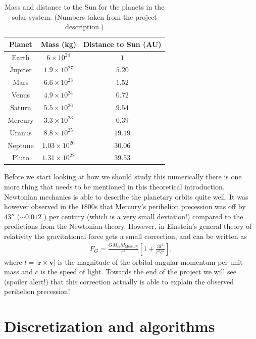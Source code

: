 \documentclass[12pt, a4paper]{article}
\begin{document}
\begin{table}
\caption{Mass and distance to the Sun for the planets in the solar system. (Numbers taken from the 
project description.)}
\label{tab:planets}
\begin{center}
\begin{tabular}{ccc} \hline\hline
Planet & Mass (kg) & Distance to Sun (AU) \\ \hline 
Earth & $6\times10^{24}$ & $1$  \\
Jupiter & $1.9\times10^{27}$ & $5.20$  \\
Mars & $6.6\times10^{23}$ & $1.52$ \\
Venus & $4.9\times10^{24}$ & $0.72$ \\
Saturn & $5.5\times10^{26}$ & $9.54$ \\ 
Mercury & $3.3\times10^{23}$ & $0.39$ \\ 
Uranus & $8.8\times10^{25}$ & $19.19$ \\ 
Neptune & $1.03\times10^{26}$ & $30.06$  \\ 
Pluto & $1.31\times10^{22}$ & $39.53$ \\ \hline \hline
\end{tabular}
\end{center}
\end{table}

Before we start looking at how we should study this numerically there is one more thing that needs to 
be mentioned in this theoretical introduction. Newtonian mechanics is able to describe 
the planetary orbits quite well. It was however observed in the $1800$s that Mercury's 
perihelion precession was off by
$43''$ ($\sim 0.012^{\circ}$) per century (which is a very small deviation!) compared to the 
predictions from the Newtonian theory. However, in Einstein's general theory of relativity 
the gravitational force gets a small correction, and can be written as 
\begin{align*}
F_G = \frac{GM_{\odot}M_{\text{Mercury}}}{r^2}\left[ 1+ \frac{3l^2}{r^2c^2} \right], 
\end{align*} 
where $l=|\mathbf{r}\times \mathbf{v}|$ is the magnitude of the orbital angular momentum per unit mass and 
$c$ is the speed of light. Towards the end of the project we will see (spoiler alert!) that this 
correction actually is able to explain the observed perihelion precession!  

\section{Discretization and algorithms}
\end{document}
